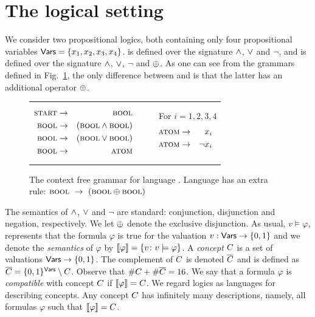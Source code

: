 \section{The logical setting}

We consider two propositional logics, both containing only four  propositional variables ${\sf Vars}=\{x_1, x_2, x_3, x_4\}$. \grambool is defined over the signature $\wedge$, $\vee$ and $\lnot$, and \gramboolxor is defined over the signature $\wedge$, $\vee$, $\lnot$ and $\oplus$. As one can see from the grammars defined in Fig.~\ref{PCFG}, the only difference between \grambool and \gramboolxor is that the latter has an additional operator $\oplus$.  
 \begin{figure}[h!]
\centering
\small\vspace{-.3cm}
\begin{tabular}{ccc}
\begin{minipage}[h]{0,2\textwidth}
\begin{eqnarray*}
\textsc{start} &\to&\textsc{bool}\\
\textsc{bool} &\to&(\textsc{bool} \wedge \textsc{bool}) \\
\textsc{bool} &\to&(\textsc{bool} \vee \textsc{bool}) \\
\textsc{bool} &\to&\textsc{atom}
\end{eqnarray*}
\end{minipage}
&
\ \quad
&
\begin{minipage}[h]{0,2\textwidth}
\ \quad For $i=1,2,3,4$
\begin{eqnarray*}
\textsc{atom} &\to& x_i \\
\textsc{atom} &\to&\lnot x_i 
\end{eqnarray*}
\end{minipage}
\end{tabular}
      \caption{The context free grammar for language \grambool.  Language \gramboolxor has an extra rule: $\textsc{bool}\  \to\ (\textsc{bool} \oplus \textsc{bool})$}
      \label{PCFG}
   \end{figure}


The semantics of $\wedge$, $\vee$ and $\lnot$ are standard: conjunction, disjunction and negation, respectively. We let $\oplus$ denote the exclusive disjunction. As usual, $v\models \varphi$, represents that the formula $\varphi$ is true for the valuation $v:{\sf Vars}\to\{0,1\}$ and we denote the {\em semantics} of $\varphi$ by $\llbracket \varphi\rrbracket=\{v\colon v\models\varphi\}$. A {\em concept} $C$ is a set of valuations ${\sf Vars}\to\{0,1\}$. The complement of $C$ is denoted $\overline {C}$ and is defined as $\overline {C}=\{0,1\}^{\sf Vars}\setminus C$. Observe that $\#C+\#\overline {C}=16$.
We say that a formula $\varphi$ is {\em compatible} with concept $C$ if $\llbracket \varphi\rrbracket=C$. We regard logics as languages for describing concepts. Any concept $C$ has infinitely many descriptions, namely, all formulas $\varphi$ such that $\llbracket \varphi\rrbracket=C$. 

